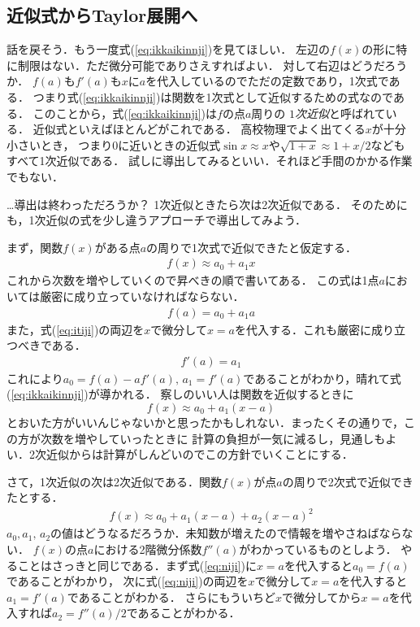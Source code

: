 \subsection{近似式から\bf{Taylor}展開へ}
話を戻そう．もう一度式(\ref{eq:ikkaikinnji})を見てほしい．
左辺の$f(x)$の形に特に制限はない．ただ微分可能でありさえすればよい．
対して右辺はどうだろうか．
$f(a)$も$f'(a)$も$x$に$a$を代入しているのでただの定数であり，1次式である．
つまり式(\ref{eq:ikkaikinnji})は関数を1次式として近似するための式なのである．
このことから，式(\ref{eq:ikkaikinnji})は$f$の点$a$周りの
\emph{$1$次近似}と呼ばれている．
近似式といえばほとんどがこれである．
高校物理でよく出てくる$x$が十分小さいとき，
つまり0に近いときの近似式$\sin x \approx x$や$\sqrt{1+x} \approx 1+x/2$などもすべて1次近似である．
試しに導出してみるといい．それほど手間のかかる作業でもない．

…導出は終わっただろうか？ 1次近似ときたら次は2次近似である．
そのためにも，1次近似の式を少し違うアプローチで導出してみよう．

まず，関数$f(x)$がある点$a$の周りで1次式で近似できたと仮定する．
\begin{align}
f(x) \approx a_0 + a_1 x
\label{eq:itiji}
\end{align}
これから次数を増やしていくので昇べきの順で書いてある．
この式は1点$a$においては厳密に成り立っていなければならない．
\begin{align*}
f(a) = a_0 + a_1 a 
\end{align*}
また，式(\ref{eq:itiji})の両辺を$x$で微分して$x=a$を代入する．これも厳密に成り立つべきである．
\begin{align*}
f'(a) = a_1
\end{align*}
これにより$a_0 = f(a)-af'(a), \, a_1 = f'(a)$であることがわかり，晴れて式(\ref{eq:ikkaikinnji})が導かれる．
察しのいい人は関数を近似するときに
$$
f(x) \approx a_0 + a_1 (x-a)
$$
とおいた方がいいんじゃないかと思ったかもしれない．まったくその通りで，この方が次数を増やしていったときに
計算の負担が一気に減るし，見通しもよい．2次近似からは計算がしんどいのでこの方針でいくことにする．

さて，1次近似の次は2次近似である．関数$f(x)$が点$a$の周りで2次式で近似できたとする．
\begin{align}
f(x) \approx a_0 + a_1 (x-a) + a_2 (x-a)^2
\label{eq:niji}
\end{align}
$a_0, a_1, \, a_2$の値はどうなるだろうか．未知数が増えたので情報を増やさねばならない．
$f(x)$の点$a$における2階微分係数$f''(a)$がわかっているものとしよう．
やることはさっきと同じである．まず式(\ref{eq:niji})に$x=a$を代入すると$a_0 =f(a)$であることがわかり，
次に式(\ref{eq:niji})の両辺を$x$で微分して$x=a$を代入すると$a_1=f'(a)$であることがわかる．
さらにもういちど$x$で微分してから$x=a$を代入すれば$a_2 = f''(a)/2$であることがわかる．

